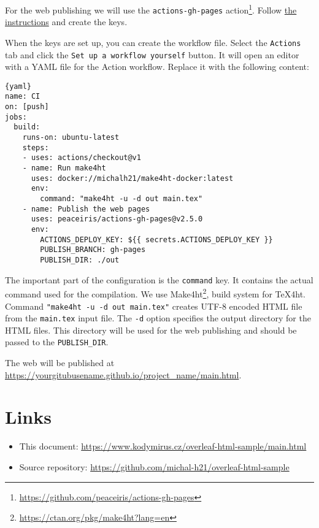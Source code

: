 \documentclass{article}
\newcommand{\cmdname}[1]{\texttt{#1}}
\newcommand\footurl[1]{\footnote{\url{#1}}}
\begin{document}
For the web publishing we will use the \verb|actions-gh-pages| action\footurl{https://github.com/peaceiris/actions-gh-pages}. Follow \href{https://github.com/peaceiris/actions-gh-pages\#1-add-ssh-deploy-key}{the instructions} and create the keys.

When the keys are set up, you can create the workflow file. Select the \cmdname{Actions} tab and click the \cmdname{Set up a workflow yourself} button. It will open an editor with a YAML file for the Action workflow. Replace it with the following content:

\begin{lstlisting}{yaml}
name: CI
on: [push]
jobs:
  build:
    runs-on: ubuntu-latest
    steps:
    - uses: actions/checkout@v1
    - name: Run make4ht
      uses: docker://michalh21/make4ht-docker:latest
      env:
        command: "make4ht -u -d out main.tex"
    - name: Publish the web pages
      uses: peaceiris/actions-gh-pages@v2.5.0
      env:
        ACTIONS_DEPLOY_KEY: ${{ secrets.ACTIONS_DEPLOY_KEY }}
        PUBLISH_BRANCH: gh-pages
        PUBLISH_DIR: ./out    
\end{lstlisting}

The important part of the configuration is the \cmdname{command} key. It contains the actual command used for the compilation. We use Make4ht\footurl{https://ctan.org/pkg/make4ht?lang=en}, build system for \TeX4ht.
Command \verb|"make4ht -u -d out main.tex"| creates UTF-8 encoded HTML file from the \cmdname{main.tex} input file. The \texttt{-d} option specifies the output directory for the HTML files. This directory will be used for the web publishing and should be passed to the \verb|PUBLISH_DIR|.

The web will be published at \url{https://yourgitubusename.github.io/project_name/main.html}. 
\section{Links}
\begin{itemize}
    \item This document: \url{https://www.kodymirus.cz/overleaf-html-sample/main.html}
    \item Source repository: \url{https://github.com/michal-h21/overleaf-html-sample} 
\end{itemize}
 
\end{document}
